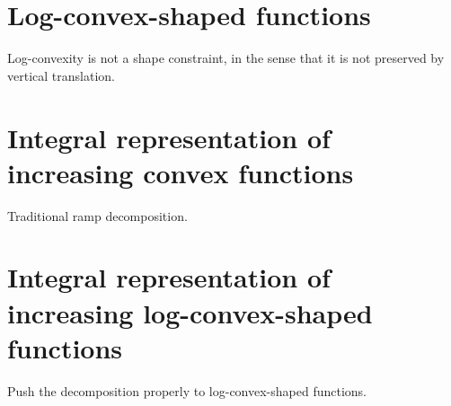 \documentclass[12pt,a4paper]{article}
\begin{document}
\section{Log-convex-shaped functions}

Log-convexity is not a shape constraint, in the sense that it is not preserved by vertical translation.

\section{Integral representation of increasing convex functions}

Traditional ramp decomposition.

\section{Integral representation of increasing log-convex-shaped functions}

Push the decomposition properly to log-convex-shaped functions.

\dobibliography
\end{document}
